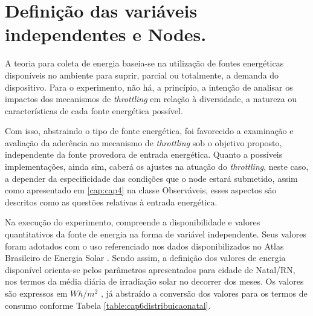 \section{Definição das variáveis independentes e Nodes.}

A teoria para coleta de energia baseia-se na utilização de fontes energéticas disponíveis no ambiente para suprir, parcial ou totalmente, a demanda do dispositivo. Para o experimento, não há, a princípio, a intenção de analisar os impactos dos mecanismos de \textit{throttling} em relação à diversidade, a natureza ou características de cada fonte energética possível.

Com isso, abstraindo o tipo de fonte energética, foi favorecido a examinação e avaliação da aderência ao mecanismo de \textit{throttling} sob o objetivo proposto, independente da fonte provedora de entrada energética. Quanto a possíveis implementações, ainda sim, caberá os ajustes na atuação do \textit{throttling}, neste caso, a depender da especificidade das condições que o node estará submetido, assim como apresentado em \ref{cap:cap4} na classe Observáveis, esses aspectos são descritos como as questões relativas à entrada energética. 

Na execução do experimento, compreende a disponibilidade e valores quantitativos da fonte de energia na forma de variável independente. Seus valores foram adotados com o uso referenciado nos dados disponibilizados no Atlas Brasileiro de Energia Solar \cite{martins2017atlas}. Sendo assim, a definição dos valores de energia disponível orienta-se pelos parâmetros apresentados para cidade de Natal/RN, nos termos da média diária de irradiação solar no decorrer  dos meses. Os valores são expressos em  $Wh/m^2$ , já abstraído a conversão dos valores para os termos de consumo conforme Tabela \ref{table:cap6distribuicaonatal}.

